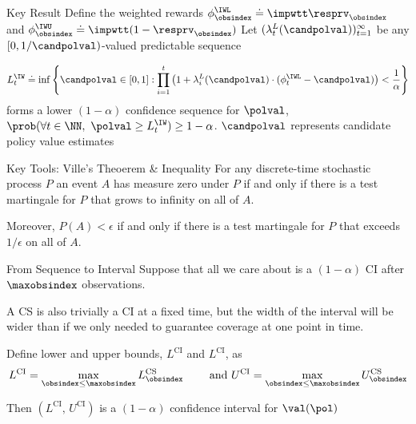 \documentclass[aspectratio=169, professionalfonts, handout]{beamer}
\begin{document}
\begin{frame}{Key Result}
	Define the weighted rewards $\phi_\obsindex^\IWL \doteq \impwtt \resprv_\obsindex$ and $\phi_\obsindex^\IWU \doteq
		\impwtt(1-\resprv_\obsindex)$
	\vfill
	Let   $(\lambda_t^L(\candpolval))_{t=1}^\infty$ be any $[0, 1/\candpolval)$-valued
	predictable sequence

	\vfill
	\begin{equation}\label{eq:kmr-cs}
		L_t^\IW \doteq \inf\left \{ \candpolval \in [0, 1] : \prod_{i=1}^t \left ( 1 + \lambda_i^L(\candpolval) \cdot (\phi_t^\IWL - \candpolval) \right ) < \frac{1}{\alpha} \right \}
	\end{equation}
	forms a lower $(1-\alpha)$ confidence sequence for $\polval$, $\prob(\forall t \in \NN,\ \polval \geq L_t^\IW) \geq 1-\alpha$.
	\vfill \pause
	$\candpolval$ represents candidate policy value estimates
\end{frame}

\begin{frame}{Key Tools: Ville's Theoerem \& Inequality}
	For any discrete-time stochastic process $P$ an event $A$ has measure zero under
	$P$ if and only if there is a test martingale for $P$ that grows to
	infinity on all of $A$.

	\vfill \pause

	Moreover, $P(A) < \epsilon$ if and only if there is a test
	martingale for $P$ that exceeds $1/\epsilon$ on all of $A$.

	\vfill \pause
\end{frame}

\begin{frame}{From Sequence to Interval}
	Suppose that all we care about is a $(1 - \alpha)$ CI after $\maxobsindex$
	observations.

	\vfill
	A CS is also trivially a CI at a fixed time, but the width of the interval
	will be wider than if we only needed to guarantee coverage at one point in
	time.

	\vfill \pause

	\begin{lemma} Define lower and upper bounds, $L^{\text{CI}}$ and
		$L^{\text{CI}}$, as
		$$L^{\text{CI}} = \max_{\obsindex \leq \maxobsindex}
			L_{\obsindex}^{\text{CS}} \qquad \text{ and } U^{\text{CI}} = \max_{\obsindex \leq
				\maxobsindex} U_{\obsindex}^{\text{CS}}$$

		Then $(L^{\text{CI}},\, U^{\text{CI}})$ is a $(1 - \alpha)$ confidence
		interval for $\val(\pol)$
	\end{lemma}
\end{frame}
\end{document}
